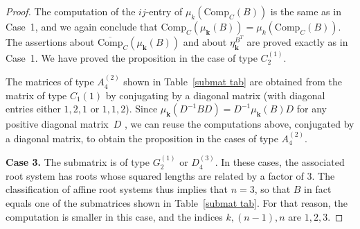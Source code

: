 \documentclass{amsart}
\theoremstyle{definition}
\theoremstyle{remark}
\numberwithin{equation}{section}
\newcommand{\0}{{\mathbf{0}}}
\newcommand{\Comp}{\mathrm{Comp}_C}
\newcommand{\CompPlus}{\overline{\mathrm{Comp}}_C}
\newcommand{\kk}{{\boldsymbol{k}}}
\begin{document}
\begin{proof}
The computation of the $ij$-entry of $\mu_k(\Comp(B))$ is the same as in Case~1, and we again conclude that $\Comp(\mu_\kk(B))=\mu_k(\Comp(B))$.
The assertions about $\CompPlus(\mu_\kk(B))$ and about $\eta^{B^T}_\kk$ are proved exactly as in Case~1.
We have proved the proposition in the case of type $C_2^{(1)}$.

The matrices of type $A_4^{(2)}$ shown in Table~\ref{submat tab} are obtained from the matrix of type $C_1{(1)}$ by conjugating by a diagonal matrix (with diagonal entries either $1,2,1$ or $1,1,2$).
Since $\mu_\kk(D^{-1}BD)=D^{-1}\mu_\kk(B)D$ for any positive diagonal matrix~$D$ \cite[Proposition~4.5]{ca1}, we can reuse the computations above, conjugated by a diagonal matrix, to obtain the proposition in the cases of type $A_4^{(2)}$.

\medskip

\noindent
\textbf{Case 3.}
The submatrix is of type  $G_2^{(1)}$ or $D_4^{(3)}$.
In these cases, the associated root system has roots whose squared lengths are related by a factor of $3$.
The classification of affine root systems thus implies that $n=3$, so that $B$ in fact equals one of the submatrices shown in Table~\ref{submat tab}.
For that reason, the computation is smaller in this case, and the indices $k,(n-1),n$ are $1,2,3$.


\end{proof}
\end{document}
